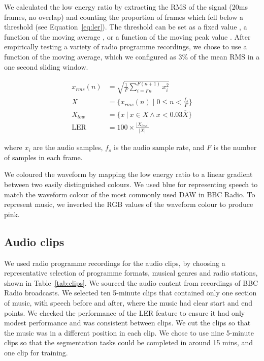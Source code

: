 We calculated the low energy ratio by extracting the RMS of the signal (20ms frames, no overlap) and counting the proportion
of frames which fell below a threshold (see Equation~\ref{eq:ler}).  The threshold can be set as a fixed value
\citep{Liang2005,Panagiotakis2005}, a function of the moving average \citep{Ericsson2009}, or a function of the moving
peak value \citep{Saunders1996}.  After empirically testing a variety of radio programme recordings, we chose to use a
function of the moving average, which we configured as 3\% of the mean RMS in a one second sliding window.

\begin{align}
  x_{rms}(n) &= \sqrt{\frac{1}{F} \displaystyle\sum\limits_{i=Fn}^{F(n+1)} x_i^2}\\
  X &= \{x_{rms}(n) \mid 0 \leq n < \frac{f_s}{F}\}\\
  X_{low} &= \{x\ | \ x \in X \wedge x < 0.03 \overline{X} \}\\
  \text{LER} &= 100 \times \frac{|X_{low}|}{|X|}\label{eq:ler}
\end{align}

where $x_i$ are the audio samples, $f_s$ is the audio sample rate, and $F$ is the number of samples in each frame.



We coloured the waveform by mapping the low energy ratio to a linear gradient between two easily distinguished colours.
We used blue for representing speech to match the waveform colour of the most commonly used DAW in BBC Radio. To
represent music, we inverted the RGB values of the waveform colour to produce pink.

\subsection{Audio clips}
We used radio programme recordings for the audio clips, by choosing a representative selection of programme formats,
musical genres and radio stations, shown in Table~\ref{tab:clips}.  We sourced the audio content from recordings of BBC
Radio broadcasts. We selected ten 5-minute clips that contained only one section of music, with speech before and
after, where the music had clear start and end points. We checked the performance of the LER feature to ensure it had
only modest performance and was consistent between clips. We cut the clips so that the music was in a different
position in each clip.  We chose to use nine 5-minute clips so that the segmentation tasks could be completed in around
15 mins, and one clip for training.

